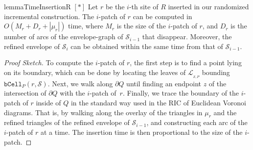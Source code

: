\documentclass[a4paper,UKenglish]{socg-lipics-v2018}
\newcommand{\icell}[1][i]{${#1}$-patch\xspace}
\newcommand{\s}{\mathcal S}
\newcommand{\bcell}[2][P]{\ensuremath{\mathtt{bCell}_{\scriptscriptstyle #1}(#2)}}
\newcommand{\LL}[1][\s, P]{\ensuremath{\mathcal L_{_{#1}}}}
\begin{document}
\begin{restatable}{lemma}{TimeInsertionR}\label{lemma:Time to insert one site of R}
\hyperref[ProofTimeInsertionR]{$[*]$}
Let $r$ be the $i$-th site of $R$ inserted in our randomized incremental construction. 
The \icell of $r$ can be computed in $O(M_r + D_r + |\mu_r|)$ time, where $M_r$ is the size of the \icell of $r$, and $D_r$ is the number of arcs of the envelope-graph of $\s_{i-1}$ that disappear.
Moreover, the refined envelope of $\s_i$ can be obtained within the same time from that of $\s_{i-1}$.
\end{restatable}
\begin{proof}[Proof Sketch]
To compute the \icell of $r$, the first step is to find a point lying on its boundary, which can be done by locating the leaves of $\LL$ bounding $\bcell{r, \s}$.
Next, we walk along $\partial Q$ until finding an endpoint $z$ of the intersection of $\partial Q$ with the \icell of~$r$. 
Finally, we trace the boundary of the \icell of $r$ inside of $Q$ in the standard way used in the RIC of Euclidean Voronoi diagrams. 
That is,  by walking along the overlay of the triangles in $\mu_r$ and the refined triangles of the refined envelope of $\s_{i-1}$, and constructing each arc of the \icell of $r$ at a time. The insertion time is then proportional to the size of the \icell.
\end{proof}
\end{document}
